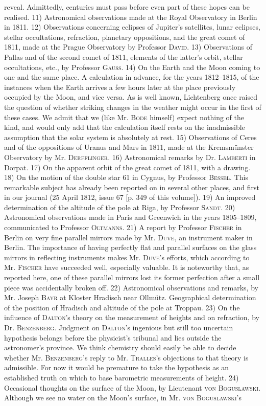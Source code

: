 reveal. Admittedly, centuries must pass before even part of these hopes can be realised. 11) Astronomical observations made at the Royal Observatory in Berlin in 1811. 12) Observations concerning eclipses of Jupiter's satellites, lunar eclipses, stellar occultations, refraction, planetary oppositions, and the great comet of 1811, made at the Prague Observatory by Professor \textsc{David}. 13) Observations of Pallas and of the second comet of 1811, elements of the latter's orbit, stellar occultations, etc., by Professor \textsc{Gauss}. 14) On the Earth and the Moon coming to one and the same place. A calculation in advance, for the years 1812--1815, of the instances when the Earth arrives a few hours later at the place previously occupied by the Moon, and vice versa. As is well known, Lichtenberg once raised the question of whether striking changes in the weather might occur in the first of these cases. We admit that we (like Mr. \textsc{Bode} himself) expect nothing of the kind, and would only add that the calculation itself rests on the inadmissible assumption that the solar system is absolutely at rest. 15) Observations of Ceres and of the oppositions of Uranus and Mars in 1811, made at the Kremsmünster Observatory by Mr. \textsc{Derfflinger}. 16) Astronomical remarks by Dr. \textsc{Lamberti} in Dorpat. 17) On the apparent orbit of the great comet of 1811, with a drawing. 18) On the motion of the double star 61 in Cygnus, by Professor \textsc{Bessel}. This remarkable subject has already been reported on in several other places, and first in our journal (25 April 1812, issue 67 [p. 349 of this volume]). 19) An improved determination of the altitude of the pole at Riga, by Professor \textsc{Sandt}. 20) Astronomical observations made in Paris and Greenwich in the years 1805--1809, communicated to Professor \textsc{Oltmanns}. 21) A report by Professor \textsc{Fischer} in Berlin on very fine parallel mirrors made by Mr. \textsc{Duve}, an instrument maker in Berlin. The importance of having perfectly flat and parallel surfaces on the glass mirrors in reflecting instruments makes Mr. \textsc{Duve}'s efforts, which according to Mr. \textsc{Fischer} have succeeded well, especially valuable. It is noteworthy that, as reported here, one of these parallel mirrors lost its former perfection after a small piece was accidentally broken off. 22) Astronomical observations and remarks, by Mr. Joseph \textsc{Bayr} at Kloster Hradisch near Ollmütz. Geographical determination of the position of Hradisch and altitude of the pole at Troppau. 23) On the influence of \textsc{Dalton}'s theory on the measurement of heights and on refraction, by Dr. \textsc{Benzenberg}. Judgment on \textsc{Dalton}'s ingenious but still too uncertain hypothesis belongs before the physicist’s tribunal and lies outside the astronomer’s province. We think chemistry should easily be able to decide whether Mr. \textsc{Benzenberg}'s reply to Mr. \textsc{Tralles}'s objections to that theory is admissible. For now it would be premature to take the hypothesis as an established truth on which to base barometric measurements of height. 24) Occasional thoughts on the surface of the Moon, by Lieutenant \textsc{von Boguslawski}. Although we see no water on the Moon's surface, in Mr. \textsc{von Boguslawski}'s 